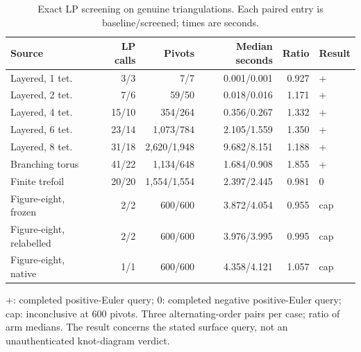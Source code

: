 \begin{table}[tbp]
\centering
\small
\setlength{\tabcolsep}{4pt}
\caption{Exact LP screening on genuine triangulations. Each paired entry is baseline/screened; times are seconds.}
\label{tab:lp-genuine}
\begin{tabular}{@{}lrrrrl@{}}
\toprule
Source & LP calls & Pivots & Median seconds & Ratio & Result\\
\midrule
Layered, 1 tet. & 3/3 & 7/7 & 0.001/0.001 & 0.927 & +\\
Layered, 2 tet. & 7/6 & 59/50 & 0.018/0.016 & 1.171 & +\\
Layered, 4 tet. & 15/10 & 354/264 & 0.356/0.267 & 1.332 & +\\
Layered, 6 tet. & 23/14 & 1,073/784 & 2.105/1.559 & 1.350 & +\\
Layered, 8 tet. & 31/18 & 2,620/1,948 & 9.682/8.151 & 1.188 & +\\
Branching torus & 41/22 & 1,134/648 & 1.684/0.908 & 1.855 & +\\
Finite trefoil & 20/20 & 1,554/1,554 & 2.397/2.445 & 0.981 & 0\\
Figure-eight, frozen & 2/2 & 600/600 & 3.872/4.054 & 0.955 & cap\\
Figure-eight, relabelled & 2/2 & 600/600 & 3.976/3.995 & 0.995 & cap\\
Figure-eight, native & 1/1 & 600/600 & 4.358/4.121 & 1.057 & cap\\
\bottomrule
\end{tabular}
\par\smallskip
\begin{minipage}{0.97\textwidth}
\footnotesize $+$: completed positive-Euler query; $0$: completed negative positive-Euler query; cap: inconclusive at 600 pivots. Three alternating-order pairs per case; ratio of arm medians. The result concerns the stated surface query, not an unauthenticated knot-diagram verdict.
\end{minipage}
\end{table}
